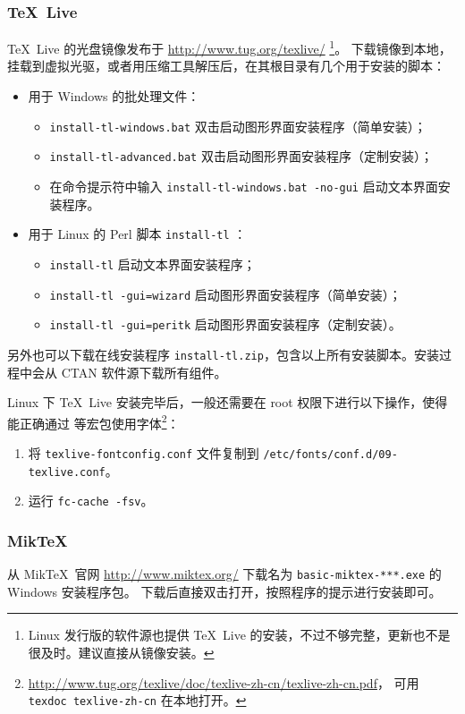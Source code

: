 \subsubsection{\TeX\ Live}

\TeX\ Live 的光盘镜像发布于 \url{http://www.tug.org/texlive/}%
\footnote{Linux 发行版的软件源也提供 \TeX\ Live 的安装，不过不够完整，更新也不是很及时。建议直接从镜像安装。}。
下载镜像到本地，挂载到虚拟光驱，或者用压缩工具解压后，在其根目录有几个用于安装的脚本：
\begin{itemize}
  \item 用于 Windows 的批处理文件：
  \begin{itemize}
    \item \texttt{install-tl-windows.bat} 双击启动图形界面安装程序（简单安装）；
    \item \texttt{install-tl-advanced.bat} 双击启动图形界面安装程序（定制安装）；
    \item 在命令提示符中输入 \texttt{install-tl-windows.bat -no-gui} 启动文本界面安装程序。
  \end{itemize}
  \item 用于 Linux 的 Perl 脚本 \texttt{install-tl} ：
  \begin{itemize}
    \item \texttt{install-tl} 启动文本界面安装程序；
    \item \texttt{install-tl -gui=wizard} 启动图形界面安装程序（简单安装）；
    \item \texttt{install-tl -gui=peritk} 启动图形界面安装程序（定制安装）。
  \end{itemize}
\end{itemize}
另外也可以下载在线安装程序 \texttt{install-tl.zip}，包含以上所有安装脚本。安装过程中会从 CTAN 软件源下载所有组件。

Linux 下 \TeX\ Live 安装完毕后，一般还需要在 root 权限下进行以下操作，使得  能正确通过 
等宏包使用字体\footnote{\url{http://www.tug.org/texlive/doc/texlive-zh-cn/texlive-zh-cn.pdf}，%
可用 \texttt{texdoc texlive-zh-cn} 在本地打开。}：
\begin{enumerate}
  \item 将 \texttt{texlive-fontconfig.conf} 文件复制到 \texttt{/etc/fonts/conf.d/09-texlive.conf}。
  \item 运行 \texttt{fc-cache -fsv}。
\end{enumerate}

\subsubsection{Mik\TeX}
从 Mik\TeX\ 官网 \url{http://www.miktex.org/} 下载名为 \texttt{basic-miktex-***.exe} 的 Windows 安装程序包。
下载后直接双击打开，按照程序的提示进行安装即可。

